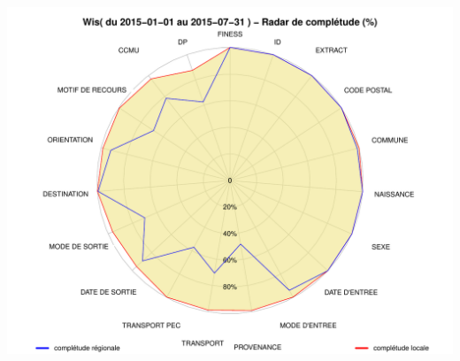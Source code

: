 \documentclass[]{article}
\begin{document}
\includegraphics{completude_files/figure-latex/finess-10.pdf}
\end{document}
